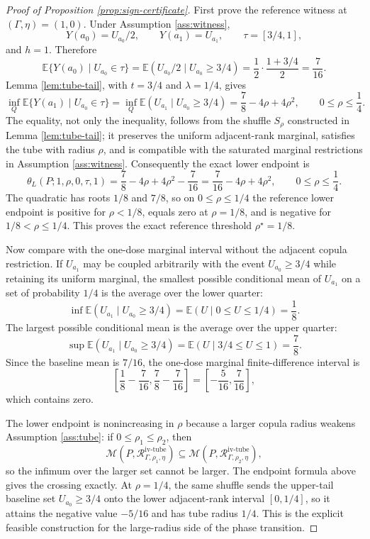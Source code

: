 \documentclass[11pt]{article}
\newcommand{\E}{\mathbb{E}}
\theoremstyle{definition}
\theoremstyle{plain}
\theoremstyle{remark}
\begin{document}
\begin{proof}[Proof of Proposition \ref{prop:sign-certificate}]
First prove the reference witness at \((\Gamma,\eta)=(1,0)\).  Under Assumption \ref{ass:witness},
\[
Y(a_0)=U_{a_0}/2,\qquad Y(a_1)=U_{a_1},\qquad \tau=[3/4,1],
\]
and \(h=1\).  Therefore
\[
\E\{Y(a_0)\mid U_{a_0}\in\tau\}
=\E(U_{a_0}/2\mid U_{a_0}\ge3/4)
=\frac12\cdot\frac{1+3/4}{2}
=\frac{7}{16}.
\]
Lemma \ref{lem:tube-tail}, with \(t=3/4\) and \(\lambda=1/4\), gives
\[
\inf_Q\E\{Y(a_1)\mid U_{a_0}\in\tau\}
=\inf_Q\E(U_{a_1}\mid U_{a_0}\ge3/4)
=\frac{7}{8}-4\rho+4\rho^2,
\qquad 0\le\rho\le\frac14.
\]
The equality, not only the inequality, follows from the shuffle \(S_\rho\) constructed in Lemma \ref{lem:tube-tail}; it preserves the uniform adjacent-rank marginal, satisfies the tube with radius \(\rho\), and is compatible with the saturated marginal restrictions in Assumption \ref{ass:witness}.  Consequently the exact lower endpoint is
\[
\theta_L(P;1,\rho,0,\tau,1)
=
\frac{7}{8}-4\rho+4\rho^2-\frac{7}{16}
=
\frac{7}{16}-4\rho+4\rho^2,
\qquad 0\le\rho\le\frac14.
\]
The quadratic has roots \(1/8\) and \(7/8\), so on \(0\le\rho\le1/4\) the reference lower endpoint is positive for \(\rho<1/8\), equals zero at \(\rho=1/8\), and is negative for \(1/8<\rho\le1/4\).  This proves the exact reference threshold \(\rho^\star=1/8\).

Now compare with the one-dose marginal interval without the adjacent copula restriction.  If \(U_{a_1}\) may be coupled arbitrarily with the event \(U_{a_0}\ge3/4\) while retaining its uniform marginal, the smallest possible conditional mean of \(U_{a_1}\) on a set of probability \(1/4\) is the average over the lower quarter:
\[
\inf \E(U_{a_1}\mid U_{a_0}\ge3/4)=\E(U\mid 0\le U\le1/4)=\frac18.
\]
The largest possible conditional mean is the average over the upper quarter:
\[
\sup \E(U_{a_1}\mid U_{a_0}\ge3/4)=\E(U\mid 3/4\le U\le1)=\frac78.
\]
Since the baseline mean is \(7/16\), the one-dose marginal finite-difference interval is
\[
\left[\frac18-\frac{7}{16},\frac78-\frac{7}{16}\right]
=
\left[-\frac{5}{16},\frac{7}{16}\right],
\]
which contains zero.

The lower endpoint is nonincreasing in \(\rho\) because a larger copula radius weakens Assumption \ref{ass:tube}: if \(0\le\rho_1\le\rho_2\), then
\[
\mathcal M(P,\mathcal R_{\Gamma,\rho_1,\eta}^{\mathrm{iv\text{-}tube}})
\subseteq
\mathcal M(P,\mathcal R_{\Gamma,\rho_2,\eta}^{\mathrm{iv\text{-}tube}}),
\]
so the infimum over the larger set cannot be larger.  The endpoint formula above gives the crossing exactly.  At \(\rho=1/4\), the same shuffle sends the upper-tail baseline set \(U_{a_0}\ge3/4\) onto the lower adjacent-rank interval \([0,1/4]\), so it attains the negative value \(-5/16\) and has tube radius \(1/4\).  This is the explicit feasible construction for the large-radius side of the phase transition.


\end{proof}
\end{document}
